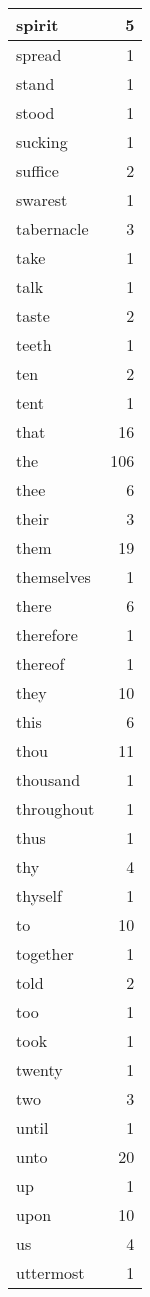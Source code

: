 \begin{center}
\begin{longtable}{l|r}
spirit & 5 \\ \hline
spread & 1 \\ \hline
stand & 1 \\ \hline
stood & 1 \\ \hline
sucking & 1 \\ \hline
suffice & 2 \\ \hline
swarest & 1 \\ \hline
tabernacle & 3 \\ \hline
take & 1 \\ \hline
talk & 1 \\ \hline
taste & 2 \\ \hline
teeth & 1 \\ \hline
ten & 2 \\ \hline
tent & 1 \\ \hline
that & 16 \\ \hline
the & 106 \\ \hline
thee & 6 \\ \hline
their & 3 \\ \hline
them & 19 \\ \hline
themselves & 1 \\ \hline
there & 6 \\ \hline
therefore & 1 \\ \hline
thereof & 1 \\ \hline
they & 10 \\ \hline
this & 6 \\ \hline
thou & 11 \\ \hline
thousand & 1 \\ \hline
throughout & 1 \\ \hline
thus & 1 \\ \hline
thy & 4 \\ \hline
thyself & 1 \\ \hline
to & 10 \\ \hline
together & 1 \\ \hline
told & 2 \\ \hline
too & 1 \\ \hline
took & 1 \\ \hline
twenty & 1 \\ \hline
two & 3 \\ \hline
until & 1 \\ \hline
unto & 20 \\ \hline
up & 1 \\ \hline
upon & 10 \\ \hline
us & 4 \\ \hline
uttermost & 1 \\ \hline

\end{longtable}
\end{center}
